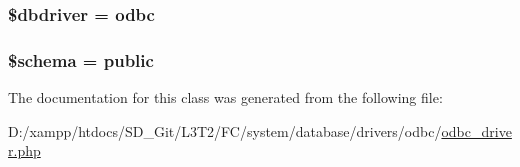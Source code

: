 \subsubsection[{\$dbdriver}]{\setlength{\rightskip}{0pt plus 5cm}\$dbdriver = \textquotesingle{}odbc\textquotesingle{}}\label{class_c_i___d_b__odbc__driver_a0cde2a16322a023d040aa7f725877597}
\hypertarget{class_c_i___d_b__odbc__driver_a83022b1d70799d2bde3d64dca9cb40ee}{}
\subsubsection[{\$schema}]{\setlength{\rightskip}{0pt plus 5cm}\$schema = \textquotesingle{}public\textquotesingle{}}\label{class_c_i___d_b__odbc__driver_a83022b1d70799d2bde3d64dca9cb40ee}


The documentation for this class was generated from the following file\+:\begin{DoxyCompactItemize}
\item 
D\+:/xampp/htdocs/\+S\+D\+\_\+\+Git/\+L3\+T2/\+F\+C/system/database/drivers/odbc/\hyperlink{odbc__driver_8php}{odbc\+\_\+driver.\+php}\end{DoxyCompactItemize}
